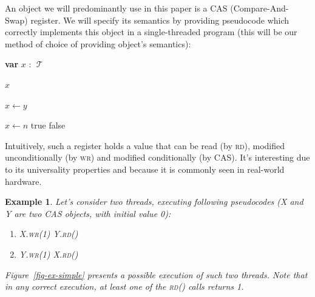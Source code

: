 \documentclass[a4paper,11pt]{article}
\def\T{\ensuremath{\operatorname{\mathcal{T}}}\text{ }}
\newtheorem{example}{Example}
\newcommand{\fn}[1]{\textsc{#1}}
\newcommand{\var}[2]{\textbf{var }#1 : #2}
\begin{document}


An object we will predominantly use in this paper is a CAS (Compare-And-Swap) register.
We will specify its semantics by providing pseudocode which correctly implements this object in
a single-threaded program (this will be our method of choice of providing object's semantics):

\begin{algorithmic}[1]
\State\var{$x$}{\T}
	
	\State\Return $x$
\EndFunction

	\State $x \gets y$
\EndFunction

	\State $x \gets n$
	\State\Return true
\Else
	\State\Return false
\EndIf
\EndFunction
\end{algorithmic}

Intuitively, such a register holds a value that can be read (by \fn{rd}), modified unconditionally (by \fn{wr})
and modified conditionally (by \fn{CAS}). It's interesting due to its universality properties\cite{cas-univ} %
and because it is
commonly seen in real-world hardware. %

\begin{example}\label{ex-simple}
Let's consider two threads, executing following pseudocodes (X and Y are two CAS objects, with initial value 0):

\begin{enumerate}
\item\begin{algorithmic}[1]
\State X.\fn{wr}(1)
\State Y.\fn{rd}()
\end{algorithmic}

\item\begin{algorithmic}[1]
\State Y.\fn{wr}(1)
\State X.\fn{rd}()
\end{algorithmic}
\end{enumerate}

Figure~\ref{fig-ex-simple} presents a possible execution of such two threads. Note that in any correct execution,
at least one of the \fn{rd}() calls returns 1.
\end{example}
\end{document}
